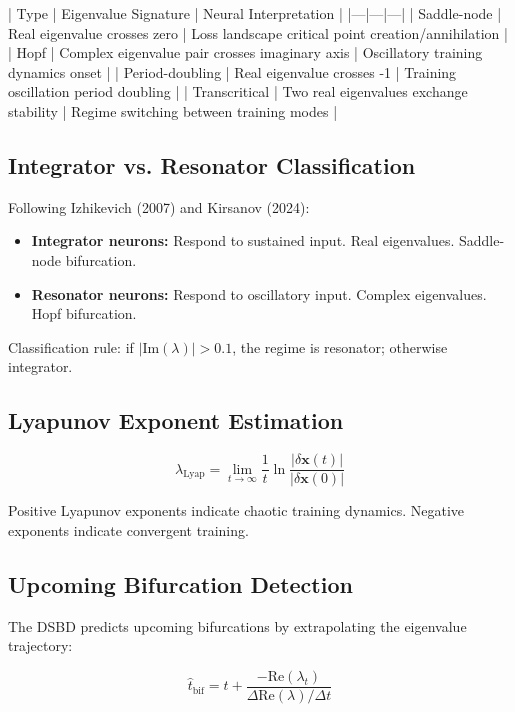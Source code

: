 \documentclass[11pt]{article}
\theoremstyle{plain}
\begin{document}
| Type | Eigenvalue Signature | Neural Interpretation |
|—|—|—|
| Saddle-node | Real eigenvalue crosses zero | Loss landscape critical point creation/annihilation |
| Hopf | Complex eigenvalue pair crosses imaginary axis | Oscillatory training dynamics onset |
| Period-doubling | Real eigenvalue crosses -1 | Training oscillation period doubling |
| Transcritical | Two real eigenvalues exchange stability | Regime switching between training modes |

\subsection{Integrator vs. Resonator Classification}

Following Izhikevich (2007) and Kirsanov (2024):

\begin{itemize}
  \item \textbf{Integrator neurons:} Respond to sustained input. Real eigenvalues. Saddle-node bifurcation.
  \item \textbf{Resonator neurons:} Respond to oscillatory input. Complex eigenvalues. Hopf bifurcation.
\end{itemize}

Classification rule: if \( |\text{Im}(\lambda)| > 0.1 \), the regime is resonator; otherwise integrator.

\subsection{Lyapunov Exponent Estimation}

\begin{equation}
\lambda_{\text{Lyap}} = \lim_{t \to \infty} \frac{1}{t} \ln \frac{|\delta \mathbf{x}(t)|}{|\delta \mathbf{x}(0)|}
\end{equation}

Positive Lyapunov exponents indicate chaotic training dynamics. Negative exponents indicate convergent training.

\subsection{Upcoming Bifurcation Detection}

The DSBD predicts upcoming bifurcations by extrapolating the eigenvalue trajectory:

\begin{equation}
\hat{t}_{\text{bif}} = t + \frac{-\text{Re}(\lambda_t)}{\Delta \text{Re}(\lambda) / \Delta t}
\end{equation}
\end{document}
